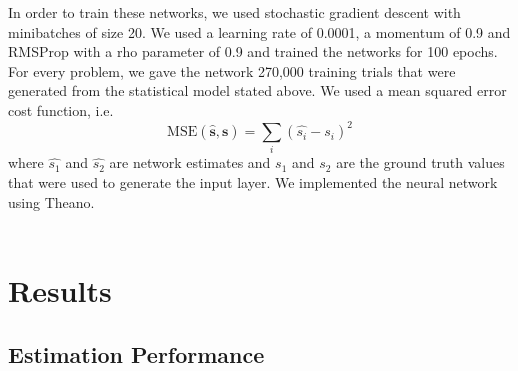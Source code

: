 \documentclass{article} %
\begin{document}
In order to train these networks, we used stochastic gradient descent with minibatches of size 20. We used a learning rate of 0.0001, a momentum of 0.9 \cite{Sutskever2013} and RMSProp \cite{Tieleman2012} with a rho parameter of 0.9 and trained the networks for 100 epochs. For every problem, we gave the network 270,000 training trials that were generated from the statistical model stated above. We used a mean squared error cost function, i.e. 
\begin{equation}
	\text{MSE}(\mathbf{\hat{s}, s}) = \sum_i(\hat{s_i} - s_i)^2 
\end{equation}
where $\hat{s_1}$ and $\hat{s_2}$ are network estimates and $s_1$ and $s_2$ are the ground truth values that were used to generate the input layer.
We implemented the neural network using Theano.
\\
\\
\section{Results}
\subsection{Estimation Performance}
\end{document}
